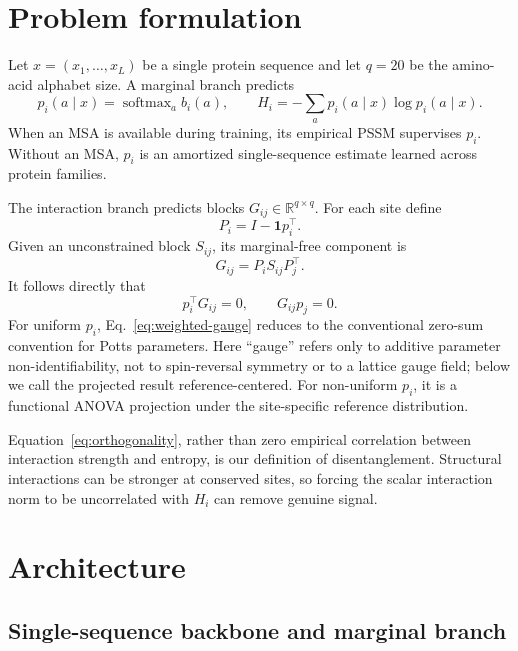 \documentclass[10pt]{article}
\newcommand{\R}{\mathbb{R}}
\begin{document}
\section{Problem formulation}

Let $x=(x_1,\ldots,x_L)$ be a single protein sequence and let $q=20$ be the amino-acid
alphabet size.  A marginal branch predicts
\begin{equation}
p_i(a\mid x)=\operatorname{softmax}_a b_i(a),
\qquad
H_i=-\sum_a p_i(a\mid x)\log p_i(a\mid x).
\end{equation}
When an MSA is available during training, its empirical PSSM supervises $p_i$.  Without an
MSA, $p_i$ is an amortized single-sequence estimate learned across protein families.

The interaction branch predicts blocks $G_{ij}\in\R^{q\times q}$.  For each site define
\begin{equation}
P_i = I - \mathbf{1}p_i^\top.
\end{equation}
Given an unconstrained block $S_{ij}$, its marginal-free component is
\begin{equation}
G_{ij}=P_iS_{ij}P_j^\top.
\label{eq:weighted-gauge}
\end{equation}
It follows directly that
\begin{equation}
p_i^\top G_{ij}=0,
\qquad
G_{ij}p_j=0.
\label{eq:orthogonality}
\end{equation}
For uniform $p_i$, Eq.~\ref{eq:weighted-gauge} reduces to the conventional zero-sum convention
for Potts parameters.  Here ``gauge'' refers only to additive parameter non-identifiability, not
to spin-reversal symmetry or to a lattice gauge field; below we call the projected result
reference-centered.
For non-uniform $p_i$, it is a functional ANOVA projection under the site-specific reference
distribution.

Equation~\ref{eq:orthogonality}, rather than zero empirical correlation between interaction
strength and entropy, is our definition of disentanglement.  Structural interactions can be
stronger at conserved sites, so forcing the scalar interaction norm to be uncorrelated with
$H_i$ can remove genuine signal.

\section{Architecture}

\subsection{Single-sequence backbone and marginal branch}
\end{document}
